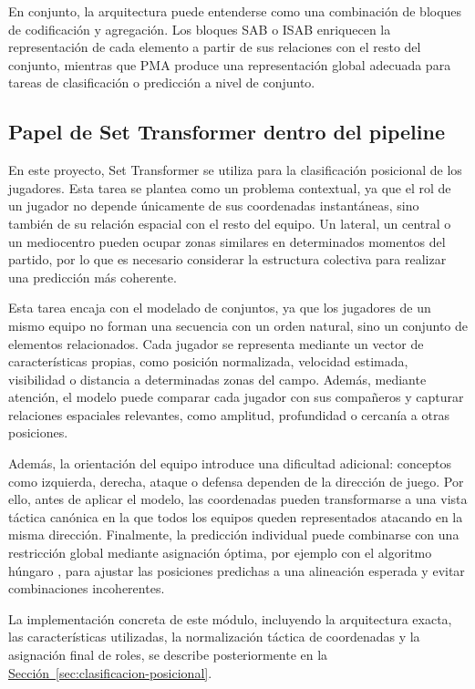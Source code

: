 En conjunto, la arquitectura puede entenderse como una combinación de bloques de codificación y agregación. Los bloques SAB o ISAB enriquecen la representación de cada elemento a partir de sus relaciones con el resto del conjunto, mientras que PMA produce una representación global adecuada para tareas de clasificación o predicción a nivel de conjunto.

\subsection{Papel de Set Transformer dentro del pipeline}
En este proyecto, Set Transformer se utiliza para la clasificación posicional de los jugadores. Esta tarea se plantea como un problema contextual, ya que el rol de un jugador no depende únicamente de sus coordenadas instantáneas, sino también de su relación espacial con el resto del equipo. Un lateral, un central o un mediocentro pueden ocupar zonas similares en determinados momentos del partido, por lo que es necesario considerar la estructura colectiva para realizar una predicción más coherente.

Esta tarea encaja con el modelado de conjuntos, ya que los jugadores de un mismo equipo no forman una secuencia con un orden natural, sino un conjunto de elementos relacionados. Cada jugador se representa mediante un vector de características propias, como posición normalizada, velocidad estimada, visibilidad o distancia a determinadas zonas del campo. Además, mediante atención, el modelo puede comparar cada jugador con sus compañeros y capturar relaciones espaciales relevantes, como amplitud, profundidad o cercanía a otras posiciones.

Además, la orientación del equipo introduce una dificultad adicional: conceptos como izquierda, derecha, ataque o defensa dependen de la dirección de juego. Por ello, antes de aplicar el modelo, las coordenadas pueden transformarse a una vista táctica canónica en la que todos los equipos queden representados atacando en la misma dirección. Finalmente, la predicción individual puede combinarse con una restricción global mediante asignación óptima, por ejemplo con el algoritmo húngaro \citep{kuhn1955hungarian}, para ajustar las posiciones predichas a una alineación esperada y evitar combinaciones incoherentes.

La implementación concreta de este módulo, incluyendo la arquitectura exacta, las características utilizadas, la normalización táctica de coordenadas y la asignación final de roles, se describe posteriormente en la \hyperref[sec:clasificacion-posicional]{Sección~\ref*{sec:clasificacion-posicional}}.
